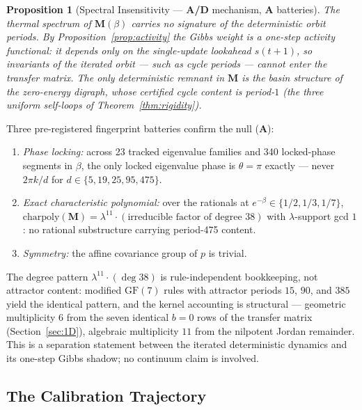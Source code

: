 \documentclass[11pt]{article}
\newtheorem{proposition}[theorem]{Proposition}
\theoremstyle{remark}
\newcommand{\GF}[1]{\ensuremath{\mathrm{GF}(#1)}}
\newcommand{\CatA}{\textbf{A}}
\newcommand{\CatAD}{\textbf{A/D}}
\begin{document}
\begin{proposition}[Spectral Insensitivity --- \CatAD{} mechanism,
\CatA{} batteries]
\label{prop:insensitivity}
The thermal spectrum of $\mathbf{M}(\beta)$ carries no signature of the
deterministic orbit periods. By Proposition~\ref{prop:activity} the Gibbs
weight is a one-step activity functional: it depends only on the single-update
lookahead $s(t+1)$, so invariants of the iterated orbit --- such as cycle
periods --- cannot enter the transfer matrix. The only deterministic remnant
in $\mathbf{M}$ is the basin structure of the zero-energy digraph, whose
certified cycle content is period-$1$ (the three uniform self-loops of
Theorem~\ref{thm:rigidity}).
\end{proposition}

Three pre-registered fingerprint batteries confirm the null (\CatA{}):
\begin{enumerate}[leftmargin=2em,itemsep=2pt]
  \item \emph{Phase locking:} across 23 tracked eigenvalue families and 340
    locked-phase segments in $\beta$, the only locked eigenvalue phase is
    $\theta = \pi$ exactly --- never $2\pi k/d$ for
    $d \in \{5, 19, 25, 95, 475\}$.
  \item \emph{Exact characteristic polynomial:} over the rationals at
    $e^{-\beta} \in \{1/2, 1/3, 1/7\}$, $\mathrm{charpoly}(\mathbf{M}) =
    \lambda^{11} \cdot (\text{irreducible factor of degree } 38)$ with
    $\lambda$-support gcd $1$: no rational substructure carrying period-475
    content.
  \item \emph{Symmetry:} the affine covariance group of $p$ is trivial.
\end{enumerate}
The degree pattern $\lambda^{11} \cdot (\deg 38)$ is rule-independent
bookkeeping, not attractor content: modified $\GF{7}$ rules with attractor
periods $15$, $90$, and $385$ yield the identical pattern, and the kernel
accounting is structural --- geometric multiplicity $6$ from the seven
identical $b = 0$ rows of the transfer matrix
(Section~\ref{sec:1D}), algebraic multiplicity $11$ from the nilpotent Jordan
remainder. This is a separation statement between the iterated deterministic
dynamics and its one-step Gibbs shadow; no continuum claim is involved.

\subsection{The Calibration Trajectory}
\label{sec:calibration}
\end{document}
